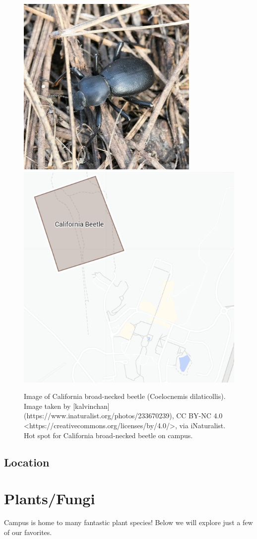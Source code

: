 \documentclass[
]{book}
\begin{document}
\begin{figure}

{\centering \includegraphics[width=0.49\linewidth,height=0.2\textheight]{insect_images/cali_beet_11} \includegraphics[width=0.49\linewidth,height=0.2\textheight]{insect_images/cali_beet_hotspot_11} 

}

\caption{Image of California broad-necked beetle (Coelocnemis dilaticollis). Image taken by [kalvinchan](https://www.inaturalist.org/photos/233670239), CC BY-NC 4.0 <https://creativecommons.org/licenses/by/4.0/>, via iNaturalist. Hot spot for California broad-necked beetle on campus.}\label{fig:unnamed-chunk-5}
\end{figure}

\hypertarget{location}{%
\section{Location}\label{location}}

\hypertarget{plantsfungi}{%
\chapter{Plants/Fungi}\label{plantsfungi}}

Campus is home to many fantastic plant species! Below we will explore just a few of our favorites.
\end{document}
